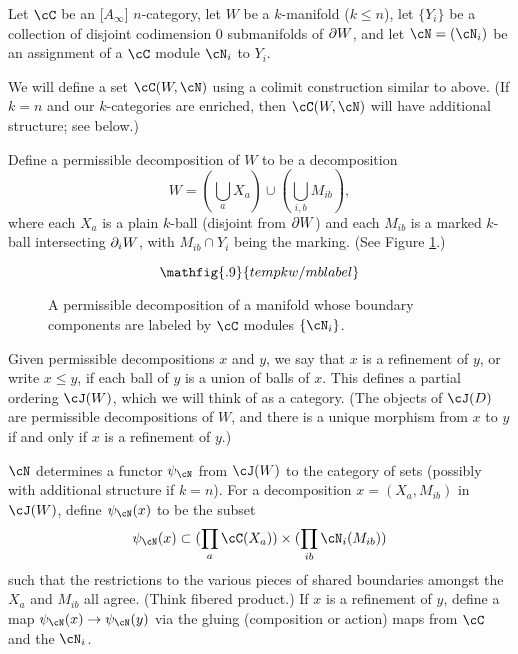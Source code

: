 Let $\cC$ be an [$A_\infty$] $n$-category, let $W$ be a $k$-manifold ($k\le n$),
let $\{Y_i\}$ be a collection of disjoint codimension 0 submanifolds of $\partial W$,
and let $\cN = (\cN_i)$ be an assignment of a $\cC$ module $\cN_i$ to $Y_i$.


We will define a set $\cC(W, \cN)$ using a colimit construction similar to above.
(If $k = n$ and our $k$-categories are enriched, then
$\cC(W, \cN)$ will have additional structure; see below.)

Define a permissible decomposition of $W$ to be a decomposition
\[
	W = (\bigcup_a X_a) \cup (\bigcup_{i,b} M_{ib}) ,
\]
where each $X_a$ is a plain $k$-ball (disjoint from $\partial W$) and
each $M_{ib}$ is a marked $k$-ball intersecting $\partial_i W$,
with $M_{ib}\cap Y_i$ being the marking.
(See Figure \ref{mblabel}.)
\begin{figure}[!ht]\begin{equation*}
\mathfig{.9}{tempkw/mblabel}
\end{equation*}\caption{A permissible decomposition of a manifold
whose boundary components are labeled by $\cC$ modules $\{\cN_i\}$.}\label{mblabel}\end{figure}
Given permissible decompositions $x$ and $y$, we say that $x$ is a refinement
of $y$, or write $x \le y$, if each ball of $y$ is a union of balls of $x$.
This defines a partial ordering $\cJ(W)$, which we will think of as a category.
(The objects of $\cJ(D)$ are permissible decompositions of $W$, and there is a unique
morphism from $x$ to $y$ if and only if $x$ is a refinement of $y$.)

$\cN$ determines 
a functor $\psi_\cN$ from $\cJ(W)$ to the category of sets 
(possibly with additional structure if $k=n$).
For a decomposition $x = (X_a, M_{ib})$ in $\cJ(W)$, define $\psi_\cN(x)$ to be the subset
\[
	\psi_\cN(x) \sub (\prod_a \cC(X_a)) \times (\prod_{ib} \cN_i(M_{ib}))
\]
such that the restrictions to the various pieces of shared boundaries amongst the
$X_a$ and $M_{ib}$ all agree.
(Think fibered product.)
If $x$ is a refinement of $y$, define a map $\psi_\cN(x)\to\psi_\cN(y)$
via the gluing (composition or action) maps from $\cC$ and the $\cN_i$.

